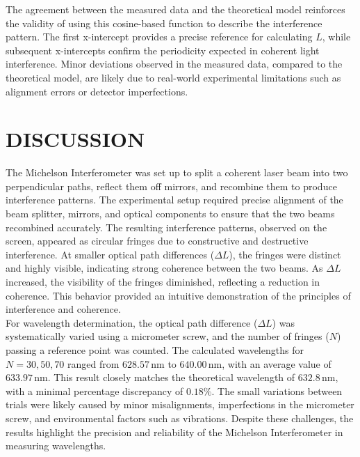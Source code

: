 \documentclass[a4paper,11pt]{article}
\begin{document}
The agreement between the measured data and the theoretical model reinforces the validity of using this cosine-based function to describe the interference pattern. The first x-intercept provides a precise reference for calculating \( L \), while subsequent x-intercepts confirm the periodicity expected in coherent light interference. Minor deviations observed in the measured data, compared to the theoretical model, are likely due to real-world experimental limitations such as alignment errors or detector imperfections.\\




\newpage
\section{\centering DISCUSSION}
\label{sec:DISCUSSION}
\indent

The Michelson Interferometer was set up to split a coherent laser beam into two perpendicular paths, reflect them off mirrors, and recombine them to produce interference patterns. The experimental setup required precise alignment of the beam splitter, mirrors, and optical components to ensure that the two beams recombined accurately. The resulting interference patterns, observed on the screen, appeared as circular fringes due to constructive and destructive interference. At smaller optical path differences ($\Delta L$), the fringes were distinct and highly visible, indicating strong coherence between the two beams. As $\Delta L$ increased, the visibility of the fringes diminished, reflecting a reduction in coherence. This behavior provided an intuitive demonstration of the principles of interference and coherence.\\

For wavelength determination, the optical path difference ($\Delta L$) was systematically varied using a micrometer screw, and the number of fringes ($N$) passing a reference point was counted. The calculated wavelengths for $N = 30, 50, 70$ ranged from $628.57 \, \text{nm}$ to $640.00 \, \text{nm}$, with an average value of $633.97 \, \text{nm}$. This result closely matches the theoretical wavelength of $632.8 \, \text{nm}$, with a minimal percentage discrepancy of $0.18\%$. The small variations between trials were likely caused by minor misalignments, imperfections in the micrometer screw, and environmental factors such as vibrations. Despite these challenges, the results highlight the precision and reliability of the Michelson Interferometer in measuring wavelengths.\\
\end{document}
